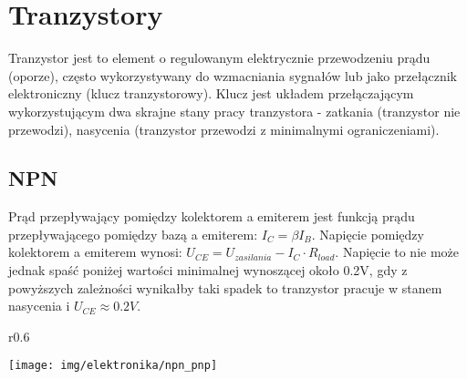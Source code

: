 % 
% 
% 
% 

\section{Tranzystory}

Tranzystor jest to element o regulowanym elektrycznie przewodzeniu prądu (oporze), często wykorzystywany do wzmacniania sygnałów lub jako przełącznik elektroniczny (klucz tranzystorowy).
Klucz jest układem przełączającym wykorzystującym dwa skrajne stany pracy tranzystora - zatkania (tranzystor nie przewodzi), nasycenia (tranzystor przewodzi z minimalnymi ograniczeniami).

\subsection{NPN}
Prąd przepływający pomiędzy kolektorem a emiterem jest funkcją prądu przepływającego pomiędzy bazą a emiterem: $I_C = \beta I_B$.
Napięcie pomiędzy kolektorem a emiterem wynosi: $U_{CE} = U_{zasilania} - I_C \cdot R_{load}$.
Napięcie to nie może jednak spaść poniżej wartości minimalnej wynoszącej około 0.2V, gdy z powyższych zależności wynikałby taki spadek to tranzystor pracuje w stanem nasycenia i $U_{CE} \approx 0.2V$.

\begin{wrapfigure}{r}{0.6\textwidth}
  \begin{center}
    \texttt{[image: img/elektronika/npn\_pnp]}
    \vspace{-10pt}
  \end{center}
\end{wrapfigure}

